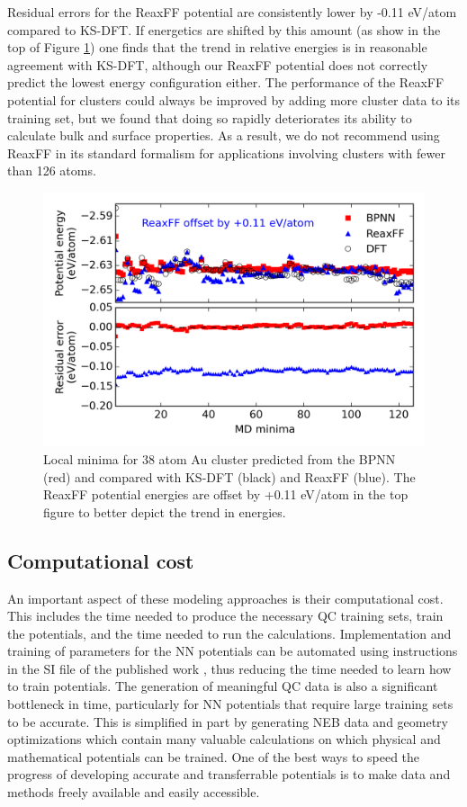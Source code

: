 \documentclass[12pt]{cmuthesis}
\begin{document}
Residual errors for the ReaxFF potential are consistently lower by -0.11 eV/atom compared to KS-DFT. If energetics are shifted by this amount (as show in the top of Figure \ref{fig-38atom-minima}) one finds that the trend in relative energies is in reasonable agreement with KS-DFT, although our ReaxFF potential does not correctly predict the lowest energy configuration either. The performance of the ReaxFF potential for clusters could always be improved by adding more cluster data to its training set, but we found that doing so rapidly deteriorates its ability to calculate bulk and surface properties. As a result, we do not recommend using ReaxFF in its standard formalism for applications involving clusters with fewer than 126 atoms.

\begin{figure}[h]
\centering
\includegraphics[width=5in]{./images/fig-38atom-minima.png}
\caption{\label{fig-38atom-minima}
Local minima for 38 atom Au cluster predicted from the BPNN (red) and compared with KS-DFT (black) and ReaxFF (blue). The ReaxFF potential energies are offset by +0.11 eV/atom in the top figure to better depict the trend in energies.}
\end{figure}

\subsection{Computational cost}
\label{sec:org60595a8}
An important aspect of these modeling approaches is their computational cost. This includes the time needed to produce the necessary QC training sets, train the potentials, and the time needed to run the calculations. Implementation and training of parameters for the NN potentials can be automated using instructions in the SI file of the published work \cite{boes-2016-neural-networ}, thus reducing the time needed to learn how to train potentials. The generation of meaningful QC data is also a significant bottleneck in time, particularly for NN potentials that require large training sets to be accurate. This is simplified in part by generating NEB data and geometry optimizations which contain many valuable calculations on which physical and mathematical potentials can be trained. One of the best ways to speed the progress of developing accurate and transferrable potentials is to make data and methods freely available and easily accessible.
\end{document}
